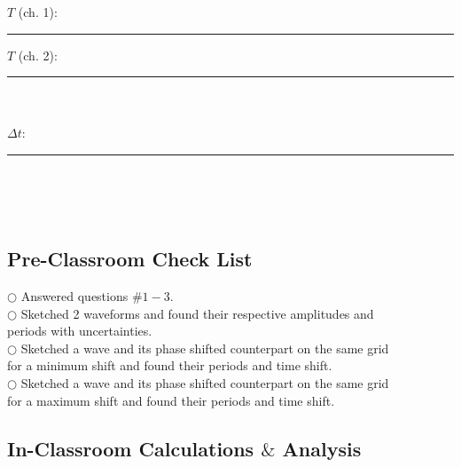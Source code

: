 $T$ (ch. 1): \rule{3cm}{.1mm} \hspace*{1cm} $T$ (ch. 2): 
\rule{3cm}{.1mm} \\
\ \\  
$\Delta t$: \rule{3cm}{.1mm} \\
\ \\
\ \\


\subsection{Pre-Classroom Check List}
\noindent $\bigcirc$ \hspace*{1cm} Answered questions $\#1-3$. \\
$\bigcirc$ \hspace*{1cm} Sketched 2 waveforms and found their respective 
amplitudes and \\ \hspace*{1.5cm} periods with uncertainties. \\
$\bigcirc$ \hspace*{1cm} Sketched a wave and its phase shifted counterpart on 
the same grid \\ \hspace*{1.5cm} for a minimum shift and found their periods and time shift. \\
$\bigcirc$ \hspace*{1cm} Sketched a wave and its phase shifted counterpart on the same grid
\\ \hspace*{1.5cm} for a maximum  shift and found their periods and time shift. \\



\subsection{In-Classroom Calculations $\&$ Analysis}
